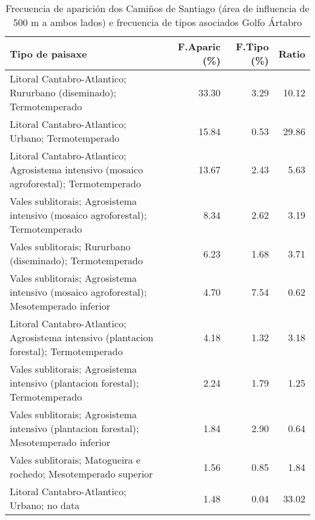 \begin{table}[p]
\centering
\caption{Frecuencia de aparición dos Camiños de Santiago (área de influencia de 500 m a ambos lados) e frecuencia de tipos asociados Golfo Ártabro} 
\label{vcamino1}
\begin{tabular}{lrrr}
  \hline
Tipo de paisaxe & F.Aparic (\%) & F.Tipo (\%) & Ratio \\ 
  \hline
Litoral Cantabro-Atlantico; Rururbano (diseminado); Termotemperado & 33.30 & 3.29 & 10.12 \\ 
  Litoral Cantabro-Atlantico; Urbano; Termotemperado & 15.84 & 0.53 & 29.86 \\ 
  Litoral Cantabro-Atlantico; Agrosistema intensivo (mosaico agroforestal); Termotemperado & 13.67 & 2.43 & 5.63 \\ 
  Vales sublitorais; Agrosistema intensivo (mosaico agroforestal); Termotemperado & 8.34 & 2.62 & 3.19 \\ 
  Vales sublitorais; Rururbano (diseminado); Termotemperado & 6.23 & 1.68 & 3.71 \\ 
  Vales sublitorais; Agrosistema intensivo (mosaico agroforestal); Mesotemperado inferior & 4.70 & 7.54 & 0.62 \\ 
  Litoral Cantabro-Atlantico; Agrosistema intensivo (plantacion forestal); Termotemperado & 4.18 & 1.32 & 3.18 \\ 
  Vales sublitorais; Agrosistema intensivo (plantacion forestal); Termotemperado & 2.24 & 1.79 & 1.25 \\ 
  Vales sublitorais; Agrosistema intensivo (plantacion forestal); Mesotemperado inferior & 1.84 & 2.90 & 0.64 \\ 
  Vales sublitorais; Matogueira e rochedo; Mesotemperado superior & 1.56 & 0.85 & 1.84 \\ 
  Litoral Cantabro-Atlantico; Urbano; no data & 1.48 & 0.04 & 33.02 \\ 
   \hline
\end{tabular}
\end{table}
